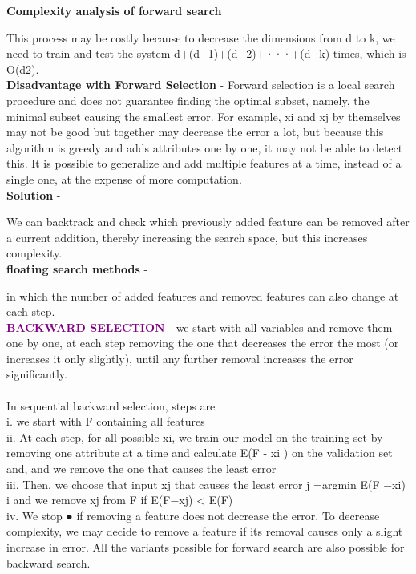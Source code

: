 \textbf {\textcolor{ReddishRose}{Complexity analysis of forward search}}

This process may be costly because to decrease the dimensions from d to k, we need to train and test the system d+(d−1)+(d−2)+···+(d−k) times, which is O(d2).
\\

\textbf {\textcolor{ReddishRose}{Disadvantage with Forward Selection} }- Forward selection is a local search procedure and does not guarantee finding the optimal subset, namely, the minimal subset causing the smallest error. For example, xi and xj by themselves may not be good but together may decrease the error a lot, but because this algorithm is greedy and adds attributes one by one, it may not be able to detect this. It is possible to generalize and add multiple features at a time, instead of a single one, at the expense of more computation.
\\

\textbf {\textcolor{ReddishRose}{Solution}} - 

We can backtrack and check which previously added feature can be removed after a current addition, thereby increasing the search space, but this increases complexity.
\\

\textbf {\textcolor{ReddishRose}{floating search methods}} -

in which the number of added features and removed features can also change at each step.
\\


\textbf {\textcolor{purple}{BACKWARD SELECTION}} - we start with all variables and remove them one by one, at each step removing the one that decreases the error the most (or increases it only slightly), until any further removal increases the error significantly.
\\ 
\\
 In sequential backward selection, steps are \\
 \hspace*{10pt}i.	we start with F containing all features \\
 \hspace*{10pt}ii.	At each step, for all possible xi, we train our model on the training set by removing one attribute at a time and calculate E(F - xi ) on the validation set and, and we remove the one that causes the least error\\
\hspace*{10pt}iii.	Then, we choose that input xj that causes the least error
j =argmin E(F −xi) i
and we remove xj from F if E(F−xj) < E(F)\\
 \hspace*{10pt}iv.	We stop
●	if removing a feature does not decrease the error. To decrease complexity, we may decide to remove a feature if its removal causes only a slight increase in error.
All the variants possible for forward search are also possible for backward search.

